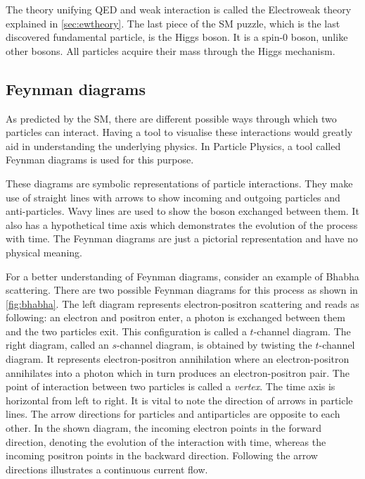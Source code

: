 The theory unifying QED and weak interaction is called the Electroweak theory explained in 
\cref{sec:ewtheory}. The last piece of the SM puzzle, which is the last discovered fundamental particle,
is the Higgs boson. It is a spin-0 boson, unlike other bosons. All particles acquire their mass 
through the Higgs mechanism.

\subsection{Feynman diagrams}

As predicted by the SM, there are different possible ways through which two particles can interact.
Having a tool to visualise these interactions would greatly aid in understanding the 
underlying physics. In Particle Physics, a tool called Feynman diagrams is used for this purpose. 

These diagrams are symbolic representations of particle interactions. They make use of straight lines 
with arrows to show incoming and outgoing particles and anti-particles. Wavy lines are used to show
the boson exchanged between them. It also has a hypothetical time axis which demonstrates the
evolution of the process with time. The Feynman diagrams are just a pictorial representation and have no 
physical meaning. 

For a better understanding of Feynman diagrams, consider an example of Bhabha scattering. 
There are two possible Feynman diagrams for this process 
as shown in \cref{fig:bhabha}. The left diagram represents electron-positron scattering and 
reads as following: an electron and positron enter, a photon is exchanged between them and the two particles exit.
This configuration is called a $t$-channel diagram. The right diagram, called an $s$-channel
diagram, is obtained by twisting the $t$-channel diagram. It represents electron-positron annihilation
where an electron-positron annihilates into a photon which in turn produces an electron-positron pair. 
The point of interaction between two particles is called a \textit{vertex}. The time axis is horizontal from left to
right. It is vital to note the direction of arrows in particle lines. The arrow directions 
for particles and antiparticles are opposite to each other.
In the shown diagram, the incoming electron points in the forward direction, denoting the 
evolution of the interaction with time, whereas the incoming positron points in the backward direction.
Following the arrow directions illustrates a continuous current flow. 


